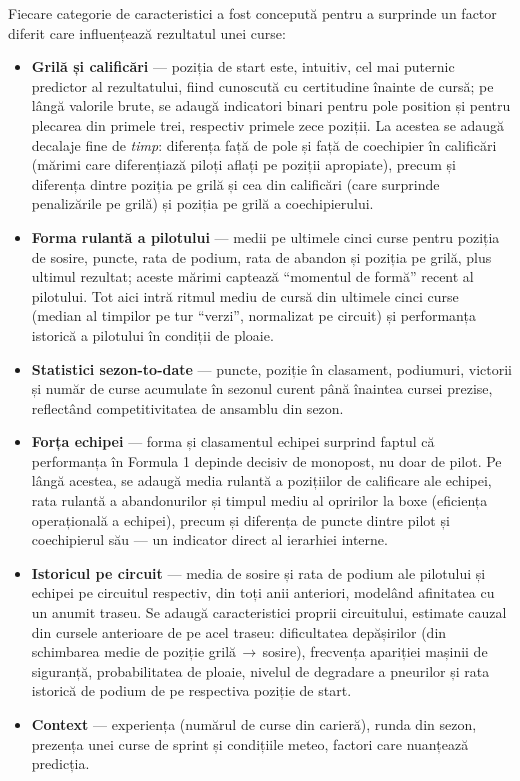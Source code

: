 \documentclass[12pt,a4paper]{report}
\begin{document}
Fiecare categorie de caracteristici a fost concepută pentru a surprinde un factor diferit care
influențează rezultatul unei curse:
\begin{itemize}
  \item \textbf{Grilă și calificări} --- poziția de start este, intuitiv, cel mai puternic predictor
    al rezultatului, fiind cunoscută cu certitudine înainte de cursă; pe lângă valorile brute, se
    adaugă indicatori binari pentru pole position și pentru plecarea din primele trei, respectiv
    primele zece poziții. La acestea se adaugă decalaje fine de \emph{timp}: diferența față de pole
    și față de coechipier în calificări (mărimi care diferențiază piloți aflați pe poziții
    apropiate), precum și diferența dintre poziția pe grilă și cea din calificări (care surprinde
    penalizările pe grilă) și poziția pe grilă a coechipierului.
  \item \textbf{Forma rulantă a pilotului} --- medii pe ultimele cinci curse pentru poziția de
    sosire, puncte, rata de podium, rata de abandon și poziția pe grilă, plus ultimul rezultat;
    aceste mărimi captează ``momentul de formă'' recent al pilotului. Tot aici intră ritmul mediu
    de cursă din ultimele cinci curse (median al timpilor pe tur ``verzi'', normalizat pe circuit)
    și performanța istorică a pilotului în condiții de ploaie.
  \item \textbf{Statistici sezon-to-date} --- puncte, poziție în clasament, podiumuri, victorii și
    număr de curse acumulate în sezonul curent până înaintea cursei prezise, reflectând competiti\-vi\-tatea
    de ansamblu din sezon.
  \item \textbf{Forța echipei} --- forma și clasamentul echipei surprind faptul că performanța în
    Formula 1 depinde decisiv de monopost, nu doar de pilot. Pe lângă acestea, se adaugă media
    rulantă a pozițiilor de calificare ale echipei, rata rulantă a abandonurilor și timpul mediu
    al opririlor la boxe (eficiența operațională a echipei), precum și diferența de puncte dintre
    pilot și coechipierul său --- un indicator direct al ierarhiei interne.
  \item \textbf{Istoricul pe circuit} --- media de sosire și rata de podium ale pilotului și echipei
    pe circuitul respectiv, din toți anii anteriori, modelând afinitatea cu un anumit traseu. Se
    adaugă caracteristici proprii circuitului, estimate cauzal din cursele anterioare de pe acel
    traseu: dificultatea depășirilor (din schimbarea medie de poziție grilă\,$\to$\,sosire),
    frecvența apariției mașinii de siguranță, probabilitatea de ploaie, nivelul de degradare a
    pneurilor și rata istorică de podium de pe respectiva poziție de start.
  \item \textbf{Context} --- experiența (numărul de curse din carieră), runda din sezon, prezența
    unei curse de sprint și condițiile meteo, factori care nuanțează predicția.
\end{itemize}
\end{document}
